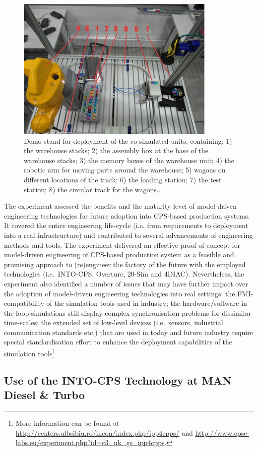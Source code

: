\begin{figure}[!ht]
	\centering
		\includegraphics[width=0.9 \textwidth]{./figures/demo_stand}
	\caption{Demo stand for deployment of the co-simulated units, containing: 1) the warehouse stacks; 2) the assembly box at the base of the warehouse stacks; 3) the memory boxes of the warehouse unit; 4) the robotic arm for moving parts around the warehouse; 5) wagons on different locations of the track; 6) the loading station; 7) the test station; 8) the circular track for the wagons..}
	\label{fig:demo_stand}
\end{figure}

The experiment assessed the benefits and the maturity level of model-driven engineering technologies for future adoption into CPS-based production systems. It covered the entire engineering life-cycle (i.e. from requirements to deployment into a real infrastructure) and contributed to several advancements of engineering methods and tools. The experiment delivered an effective proof-of-concept for model-driven engineering of CPS-based production system as a feasible and promising approach to (re)engineer the factory of the future with the employed technologies (i.e.\ INTO-CPS, Overture, 20-Sim and 4DIAC). Nevertheless, the experiment also identified a number of issues that may have further impact over the adoption of model-driven engineering technologies into real settings: the FMI-compatibility of the simulation tools used in industry; the hardware/software-in-the-loop simulations still display complex synchronisation problems for dissimilar time-scales; the extended set of low-level devices (i.e.\ sensors, industrial communication standards etc.) that are used in today and future industry require special standardisation effort to enhance the deployment capabilities of the simulation tools\footnote{More information can be found at \url{http://centers.ulbsibiu.ro/incon/index.php/ipp4cpps/} and \url{http://www.cpse-labs.eu/experiment.php?id=c3_uk_gs_ipp4cpps}.}

\subsection{Use of the INTO-CPS Technology at MAN Diesel \& Turbo}

\cite{Pedersen&17}